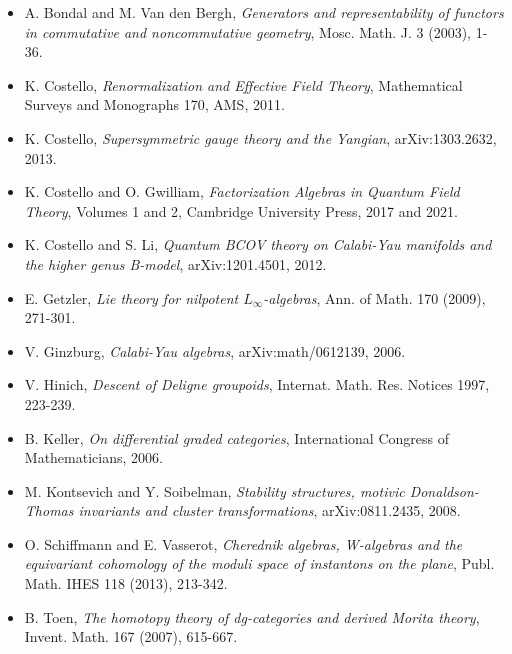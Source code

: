 \documentclass[11pt]{amsart}
\theoremstyle{plain}
\theoremstyle{definition}
\theoremstyle{remark}
\begin{document}
\begin{itemize}[leftmargin=1em,itemsep=1pt]
\item A. Bondal and M. Van den Bergh, \emph{Generators and representability of functors in commutative and noncommutative geometry}, Mosc. Math. J. 3 (2003), 1-36.
\item K. Costello, \emph{Renormalization and Effective Field Theory}, Mathematical Surveys and Monographs 170, AMS, 2011.
\item K. Costello, \emph{Supersymmetric gauge theory and the Yangian}, arXiv:1303.2632, 2013.
\item K. Costello and O. Gwilliam, \emph{Factorization Algebras in Quantum Field Theory}, Volumes 1 and 2, Cambridge University Press, 2017 and 2021.
\item K. Costello and S. Li, \emph{Quantum BCOV theory on Calabi-Yau manifolds and the higher genus B-model}, arXiv:1201.4501, 2012.
\item E. Getzler, \emph{Lie theory for nilpotent \(L_\infty\)-algebras}, Ann. of Math. 170 (2009), 271-301.
\item V. Ginzburg, \emph{Calabi-Yau algebras}, arXiv:math/0612139, 2006.
\item V. Hinich, \emph{Descent of Deligne groupoids}, Internat. Math. Res. Notices 1997, 223-239.
\item B. Keller, \emph{On differential graded categories}, International Congress of Mathematicians, 2006.
\item M. Kontsevich and Y. Soibelman, \emph{Stability structures, motivic Donaldson-Thomas invariants and cluster transformations}, arXiv:0811.2435, 2008.
\item O. Schiffmann and E. Vasserot, \emph{Cherednik algebras, W-algebras and the equivariant cohomology of the moduli space of instantons on the plane}, Publ. Math. IHES 118 (2013), 213-342.
\item B. Toen, \emph{The homotopy theory of dg-categories and derived Morita theory}, Invent. Math. 167 (2007), 615-667.
\end{itemize}
\end{document}
